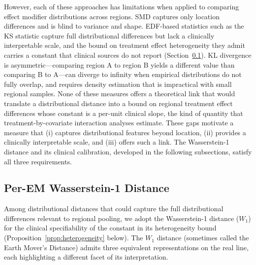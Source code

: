 \documentclass[AMA,Times1COL]{WileyNJDv5}
\begin{document}
However, each of these approaches has limitations when applied to comparing effect modifier distributions across regions. SMD captures only location differences and is blind to variance and shape. EDF-based statistics such as the KS statistic capture full distributional differences but lack a clinically interpretable scale, and the bound on treatment effect heterogeneity they admit carries a constant that clinical sources do not report (Section~\ref{sec:nabcd_metric}). KL divergence is asymmetric---comparing region A to region B yields a different value than comparing B to A---can diverge to infinity when empirical distributions do not fully overlap, and requires density estimation that is impractical with small regional samples. None of these measures offers a theoretical link that would translate a distributional distance into a bound on regional treatment effect differences whose constant is a per-unit clinical slope, the kind of quantity that treatment-by-covariate interaction analyses estimate. These gaps motivate a measure that (i) captures distributional features beyond location, (ii) provides a clinically interpretable scale, and (iii) offers such a link. The Wasserstein-1 distance and its clinical calibration, developed in the following subsections, satisfy all three requirements.

\subsection{Per-EM Wasserstein-1 Distance}\label{sec:nabcd_metric}

Among distributional distances that could capture the full distributional differences relevant to regional pooling, we adopt the Wasserstein-1 distance ($W_1$) for the clinical specifiability of the constant in its heterogeneity bound (Proposition~\ref{prop:heterogeneity} below). The $W_1$ distance (sometimes called the Earth Mover's Distance) admits three equivalent representations on the real line, each highlighting a different facet of its interpretation.\cite{villani2009,vallender1974}
\end{document}
